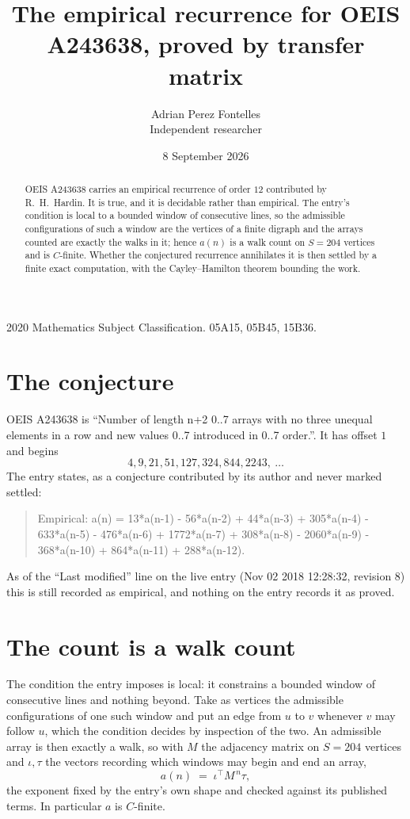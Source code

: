 \documentclass[11pt,a4paper]{article}
\title{The empirical recurrence for OEIS A243638, proved by transfer matrix}
\author{Adrian Perez Fontelles\\ \small Independent researcher}
\date{8 September 2026}
\theoremstyle{plain}
\theoremstyle{definition}
\begin{document}
\maketitle

\begin{abstract}
OEIS A243638 carries an empirical recurrence of order $12$ contributed by R.~H.~Hardin. It is
true, and it is decidable rather than empirical. The entry's condition is local to a bounded window of consecutive lines, so
the admissible configurations of such a window are the vertices of a finite digraph and the
arrays counted are exactly the walks in it; hence $a(n)$ is a walk count on $S=204$ vertices
and is $C$-finite. Whether the conjectured recurrence annihilates it is then settled by a
finite exact computation, with the Cayley--Hamilton theorem bounding the work.
\end{abstract}

\noindent\small 2020 Mathematics Subject Classification. 05A15, 05B45, 15B36.\normalsize

\section{The conjecture}

OEIS A243638 is ``Number of length n+2 0..7 arrays with no three unequal elements in a row and new values 0..7 introduced in 0..7 order.''. It has offset $1$ and begins
\[
4, 9, 21, 51, 127, 324, 844, 2243,\ \dots
\]
The entry states, as a conjecture contributed by its author and never marked settled:
\begin{quote}
Empirical: a(n) = 13*a(n-1) - 56*a(n-2) + 44*a(n-3) + 305*a(n-4) - 633*a(n-5) - 476*a(n-6) + 1772*a(n-7) + 308*a(n-8) - 2060*a(n-9) - 368*a(n-10) + 864*a(n-11) + 288*a(n-12).
\end{quote}
As of the ``Last modified'' line on the live entry (Nov 02 2018 12:28:32, revision 8) this is still
recorded as empirical, and nothing on the entry records it as proved.

\section{The count is a walk count}

The condition the entry imposes is local: it constrains a bounded window of consecutive lines and nothing beyond. Take as
vertices the admissible configurations of one such window and put an edge from $u$ to $v$
whenever $v$ may follow $u$, which the condition decides by inspection of the two. An
admissible array is then exactly a walk, so with $M$ the adjacency matrix on $S=204$ vertices
and $\iota,\tau$ the vectors recording which windows may begin and end an array,
\[
a(n)\;=\;\iota^{\!\top}M^{\,n}\tau ,
\]
the exponent fixed by the entry's own shape and checked against its published terms. In
particular $a$ is $C$-finite.
\end{document}
